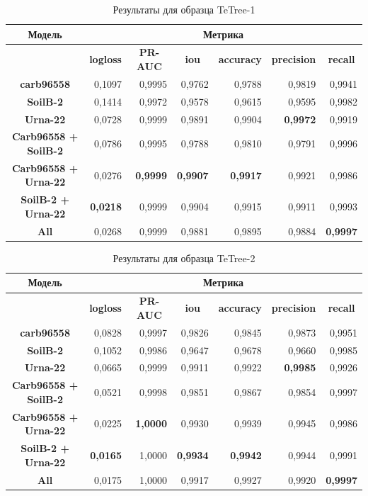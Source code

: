 \documentclass[12pt, a4paper]{extarticle}
\begin{document}
\begin{table}[htbp]
\small
\begin{tabular}{|c|r|r|r|r|r|r|}
\hline
\textbf{Модель} & \multicolumn{ 6}{c|}{\textbf{Метрика}} \\ \hline
\textbf{} & \multicolumn{1}{c|}{\textbf{logloss}} & \multicolumn{1}{c|}{\textbf{PR-AUC}} & \multicolumn{1}{c|}{\textbf{iou}} & \multicolumn{1}{c|}{\textbf{accuracy}} & \multicolumn{1}{c|}{\textbf{precision}} & \multicolumn{1}{c|}{\textbf{recall}} \\ \hline
\textbf{carb96558} & 0,1097 & 0,9995 & 0,9762 & 0,9788 & 0,9819 & 0,9941 \\ \hline
\textbf{SoilB-2} & 0,1414 & 0,9972 & 0,9578 & 0,9615 & 0,9595 & 0,9982 \\ \hline
\textbf{Urna-22} & 0,0728 & 0,9999 & 0,9891 & 0,9904 & \textbf{0,9972} & 0,9919 \\ \hline
\textbf{Carb96558 + SoilB-2} & 0,0786 & 0,9995 & 0,9788 & 0,9810 & 0,9791 & 0,9996 \\ \hline
\textbf{Carb96558 + Urna-22} & 0,0276 & \textbf{0,9999} & \textbf{0,9907} & \textbf{0,9917} & 0,9921 & 0,9986 \\ \hline
\textbf{SoilB-2 + Urna-22} & \textbf{0,0218} & 0,9999 & 0,9904 & 0,9915 & 0,9911 & 0,9993 \\ \hline
\textbf{All} & 0,0268 & 0,9999 & 0,9881 & 0,9895 & 0,9884 & \textbf{0,9997} \\ \hline
\end{tabular}
\caption{Результаты для образца TeTree-1}
\label{TeTree_1}
\end{table}

\begin{table}[htbp]
\small
\begin{tabular}{|c|r|r|r|r|r|r|}
\hline
\textbf{Модель} & \multicolumn{ 6}{c|}{\textbf{Метрика}} \\ \hline
\textbf{} & \multicolumn{1}{c|}{\textbf{logloss}} & \multicolumn{1}{c|}{\textbf{PR-AUC}} & \multicolumn{1}{c|}{\textbf{iou}} & \multicolumn{1}{c|}{\textbf{accuracy}} & \multicolumn{1}{c|}{\textbf{precision}} & \multicolumn{1}{c|}{\textbf{recall}} \\ \hline
\textbf{carb96558} & 0,0828 & 0,9997 & 0,9826 & 0,9845 & 0,9873 & 0,9951 \\ \hline
\textbf{SoilB-2} & 0,1052 & 0,9986 & 0,9647 & 0,9678 & 0,9660 & 0,9985 \\ \hline
\textbf{Urna-22} & 0,0665 & 0,9999 & 0,9911 & 0,9922 & \textbf{0,9985} & 0,9926 \\ \hline
\textbf{Carb96558 + SoilB-2} & 0,0521 & 0,9998 & 0,9851 & 0,9867 & 0,9854 & 0,9997 \\ \hline
\textbf{Carb96558 + Urna-22} & 0,0225 & \textbf{1,0000} & 0,9930 & 0,9939 & 0,9945 & 0,9986 \\ \hline
\textbf{SoilB-2 + Urna-22} & \textbf{0,0165} & 1,0000 & \textbf{0,9934} & \textbf{0,9942} & 0,9944 & 0,9991 \\ \hline
\textbf{All} & 0,0175 & 1,0000 & 0,9917 & 0,9927 & 0,9920 & \textbf{0,9997} \\ \hline
\end{tabular}
\caption{Результаты для образца TeTree-2}
\label{TeTree-2}
\end{table}
\end{document}
